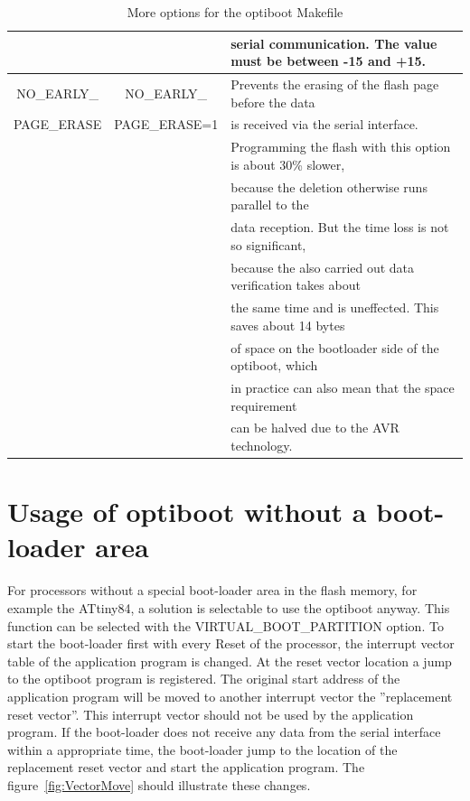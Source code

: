 \begin{table}[H]
\begin{center}
\begin{tabular}{| c | c | l |}
                   &                & serial communication. The value must be between -15 and +15. \\
    \hline
 NO\_EARLY\_       &  NO\_EARLY\_   & Prevents the erasing of the flash page before the data \\
 PAGE\_ERASE       & PAGE\_ERASE=1  & is received via the serial interface. \\
                   &                & Programming the flash with this option is about 30\% slower, \\
                   &                & because the deletion otherwise runs parallel to the \\
		   &                & data reception. But the time loss is not so significant, \\
                   &                & because the also carried out data verification takes about \\
		   &                & the same time and is uneffected. This saves about 14 bytes \\
		   &                & of space on the bootloader side of the optiboot, which \\
		   &                & in practice can also mean that the space requirement  \\
		   &                & can be halved due to the AVR technology. \\
    \hline
    \end{tabular}
  \end{center}
  \caption{More options for the optiboot Makefile}
  \label{tab:options3}
\end{table}

\section{Usage of optiboot without a boot-loader area}

For processors without a special boot-loader area in the flash memory, for example the ATtiny84,
a solution is selectable to use the optiboot anyway.
This function can be selected with the VIRTUAL\_BOOT\_PARTITION option.
To start the boot-loader first with every Reset of the processor, the interrupt
vector table of the application program is changed.
At the reset vector location a jump to the optiboot program is registered.
The original start address of the application program will be moved to
another interrupt vector the ''replacement reset vector''.
This interrupt vector should not be used by the application program.
If the boot-loader does not receive any data from the serial interface within
a appropriate time, the boot-loader jump to the location of the replacement
reset vector and start the application program.
The figure~\ref{fig:VectorMove} should illustrate these changes.

